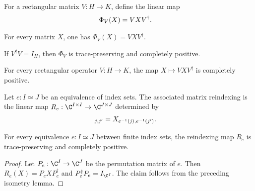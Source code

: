 \begin{definition}
    \label{def:mpdo_single_kraus_map}
    \leanok
    For a rectangular matrix $V:H\to K$, define the linear map
    \begin{align}
        \Phi_V(X)&=VXV^\dagger.
        \notag
    \end{align}
\end{definition}

\begin{lemma}
    \label{lem:mpdo_single_kraus_map_apply}
    \leanok
    For every matrix $X$, one has $\Phi_V(X)=VXV^\dagger$.
\end{lemma}

\begin{theorem}
    \label{thm:mpdo_single_kraus_map_cptp}
    \leanok
    If $V^\dagger V=I_H$, then $\Phi_V$ is trace-preserving and completely
    positive.
\end{theorem}

\begin{lemma}
    \label{lem:mpdo_single_kraus_map_cp}
    \leanok
    For every rectangular operator $V:H\to K$, the map
    $X\mapsto VXV^\dagger$ is completely positive.
\end{lemma}

\begin{definition}
    \label{def:mpdo_equiv_reindex_map}
    \leanok
    Let $e:I\simeq J$ be an equivalence of index sets. The associated
    matrix reindexing is the linear map
    $R_e:\C^{I\times I}\to\C^{J\times J}$ determined by
    \begin{align}
        [R_e(X)]_{j,j'}
        &=X_{e^{-1}(j),e^{-1}(j')}.
        \notag
    \end{align}
\end{definition}

\begin{theorem}
    \label{thm:mpdo_equiv_reindex_cptp}
    \leanok
    For every equivalence $e:I\simeq J$ between finite index sets, the
    reindexing map $R_e$ is trace-preserving and completely positive.
\end{theorem}
\begin{proof}
    \leanok
    Let $P_e:\C^I\to\C^J$ be the permutation matrix of $e$. Then
    $R_e(X)=P_eXP_e^\dagger$ and $P_e^\dagger P_e=I_{\C^I}$.
    The claim follows from the preceding isometry lemma.
\end{proof}

